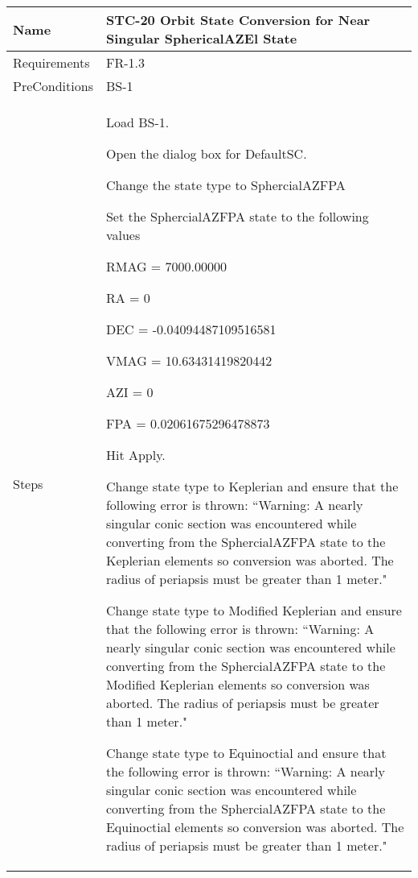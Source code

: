 \begin{table}[htbp!]
\centering
      \begin{tabular}{|p{1.05 in} |p{4.75 in} |}
      \hline
         \rowcolor[rgb]{0.8,0.8,0.8} Name & STC-20 Orbit State Conversion for Near Singular SphericalAZEl State \\
         \hline
         Requirements & FR-1.3\\  \hline
         PreConditions & BS-1\\     \hline
        Steps &
         \begin{compactenum}
             \item Load BS-1.
             \item Open the dialog box for DefaultSC.
             \item Change the state type to SphercialAZFPA
             \item Set the SphercialAZFPA state to the following values
                 \begin{compactenum}
                    \item RMAG  = 7000.00000
                    \item RA = 0
                    \item DEC = -0.04094487109516581
                    \item VMAG = 10.63431419820442
                    \item AZI = 0
                    \item FPA = 0.02061675296478873
                    \end{compactenum}
             \item Hit Apply.
             \item Change state type to Keplerian and ensure that the following error is thrown: ``Warning: A nearly singular conic section was encountered while converting from the SphercialAZFPA state to the Keplerian elements so conversion was aborted.  The radius of periapsis must be greater than 1 meter."
             \item Change state type to Modified Keplerian and ensure that the following error is thrown: ``Warning: A nearly singular conic section was encountered while converting from the SphercialAZFPA state to the Modified Keplerian elements so conversion was aborted.  The radius of periapsis must be greater than 1 meter."
             \item Change state type to Equinoctial and ensure that the following error is thrown:  ``Warning: A nearly singular conic section was encountered while converting from the SphercialAZFPA state to the Equinoctial elements so conversion was aborted.  The radius of periapsis must be greater than 1 meter."

\end{compactenum}
\end{tabular}
\end{table}
